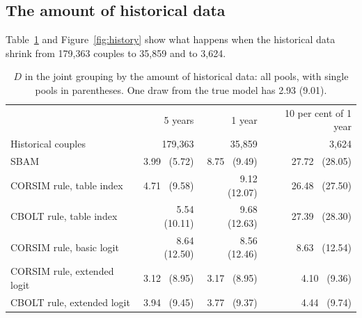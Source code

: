 \documentclass[12pt,a4paper]{article}
\begin{document}
\subsection{The amount of historical data}\label{sec:history}

Table~\ref{tab:history} and Figure~\ref{fig:history} show what happens when the historical data
shrink from 179,363 couples to 35,859 and to 3,624.

\begin{table}[H]
\centering
\caption{$D$ in the joint grouping by the amount of historical data: all pools, with single
pools in parentheses. One draw from the true model has 2.93 (9.01).}
\label{tab:history}
\small
\begin{tabular}{@{}l rrr@{}}
\toprule
 & 5 years & 1 year & 10 per cent of 1 year \\
Historical couples & 179,363 & 35,859 & 3,624 \\
\midrule
SBAM & 3.99 \ (5.72) & 8.75 \ (9.49) & 27.72 \ (28.05) \\
CORSIM rule, table index & 4.71 \ (9.58) & 9.12 \ (12.07) & 26.48 \ (27.50) \\
CBOLT rule, table index & 5.54 \ (10.11) & 9.68 \ (12.63) & 27.39 \ (28.30) \\
\addlinespace
CORSIM rule, basic logit & 8.64 \ (12.50) & 8.56 \ (12.46) & 8.63 \ (12.54) \\
CORSIM rule, extended logit & 3.12 \ (8.95) & 3.17 \ (8.95) & 4.10 \ (9.36) \\
CBOLT rule, extended logit & 3.94 \ (9.45) & 3.77 \ (9.37) & 4.44 \ (9.74) \\
\bottomrule
\end{tabular}
\end{table}
\end{document}
